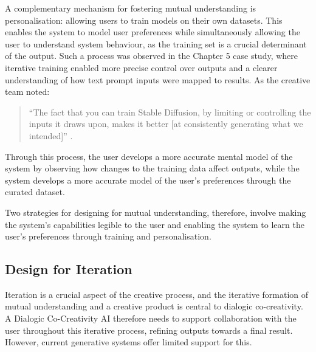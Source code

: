 A complementary mechanism for fostering mutual understanding is personalisation: allowing users to train models on their own datasets. This enables the system to model user preferences while simultaneously allowing the user to understand system behaviour, as the training set is a crucial determinant of the output. Such a process was observed in the Chapter 5 case study, where iterative training enabled more precise control over outputs and a clearer understanding of how text prompt inputs were mapped to results. As the creative team noted:

\begin{quote}
``The fact that you can train Stable Diffusion, by limiting or controlling the inputs it draws upon, makes it better [at consistently generating what we intended]'' \citep{Drummond2023-av}.
\end{quote}

Through this process, the user develops a more accurate mental model of the system by observing how changes to the training data affect outputs, while the system develops a more accurate model of the user's preferences through the curated dataset.

Two strategies for designing for mutual understanding, therefore, involve making the system's capabilities legible to the user and enabling the system to learn the user's preferences through training and personalisation. 

\subsection{Design for Iteration}

Iteration is a crucial aspect of the creative process, and the iterative formation of mutual understanding and a creative product is central to dialogic co-creativity. A Dialogic Co-Creativity AI therefore needs to support collaboration with the user throughout this iterative process, refining outputs towards a final result. However, current generative systems offer limited support for this.

